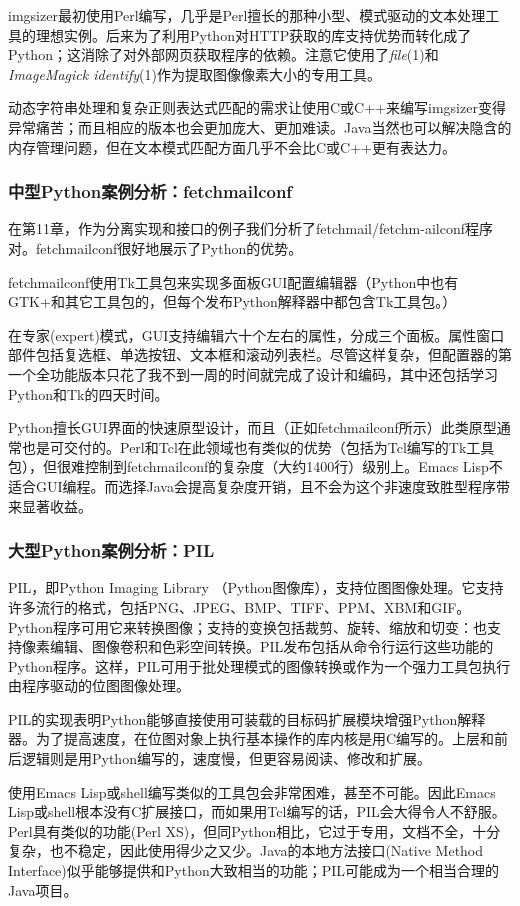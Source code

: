 \documentclass[12pt,oneside]{ctexbook}
\begin{document}
\begin{common-format}
imgsizer最初使用Perl编写，几乎是Perl擅长的那种小型、模式驱动的文本处理工具的理想实例。后来为了利用Python对HTTP获取的库支持优势而转化成了Python；这消除了对外部网页获取程序的依赖。注意它使用了\textit{file}(1)和\textit{ImageMagick identify}(1)作为提取图像像素大小的专用工具。

动态字符串处理和复杂正则表达式匹配的需求让使用C或C++来编写imgsizer变得异常痛苦；而且相应的版本也会更加庞大、更加难读。Java当然也可以解决隐含的内存管理问题，但在文本模式匹配方面几乎不会比C或C++更有表达力。

\subsubsection{中型Python案例分析：fetchmailconf}
在第11章，作为分离实现和接口的例子我们分析了fetchmail/fetchm-ailconf程序对。fetchmailconf很好地展示了Python的优势。

fetchmailconf使用Tk工具包来实现多面板GUI配置编辑器（Python中也有GTK+和其它工具包的，但每个发布Python解释器中都包含Tk工具包。）

在专家(expert)模式，GUI支持编辑六十个左右的属性，分成三个面板。属性窗口部件包括复选框、单选按钮、文本框和滚动列表栏。尽管这样复杂，但配置器的第一个全功能版本只花了我不到一周的时间就完成了设计和编码，其中还包括学习Python和Tk的四天时间。

Python擅长GUI界面的快速原型设计，而且（正如fetchmailconf所示）此类原型通常也是可交付的。Perl和Tcl在此领域也有类似的优势（包括为Tcl编写的Tk工具包），但很难控制到fetchmailconf的复杂度（大约1400行）级别上。Emacs Lisp不适合GUI编程。而选择Java会提高复杂度开销，且不会为这个非速度致胜型程序带来显著收益。

\subsubsection{大型Python案例分析：PIL}
PIL，即Python Imaging Library （Python图像库），支持位图图像处理。它支持许多流行的格式，包括PNG、JPEG、BMP、TIFF、PPM、XBM和GIF。Python程序可用它来转换图像；支持的变换包括裁剪、旋转、缩放和切变：也支持像素编辑、图像卷积和色彩空间转换。PIL发布包括从命令行运行这些功能的Python程序。这样，PIL可用于批处理模式的图像转换或作为一个强力工具包执行由程序驱动的位图图像处理。

PIL的实现表明Python能够直接使用可装载的目标码扩展模块增强Python解释器。为了提高速度，在位图对象上执行基本操作的库内核是用C编写的。上层和前后逻辑则是用Python编写的，速度慢，但更容易阅读、修改和扩展。

使用Emacs Lisp或shell编写类似的工具包会非常困难，甚至不可能。因此Emacs Lisp或shell根本没有C扩展接口，而如果用Tcl编写的话，PIL会大得令人不舒服。Perl具有类似的功能(Perl XS)，但同Python相比，它过于专用，文档不全，十分复杂，也不稳定，因此使用得少之又少。Java的本地方法接口(Native Method Interface)似乎能够提供和Python大致相当的功能；PIL可能成为一个相当合理的Java项目。


\end{common-format}
\end{document}
